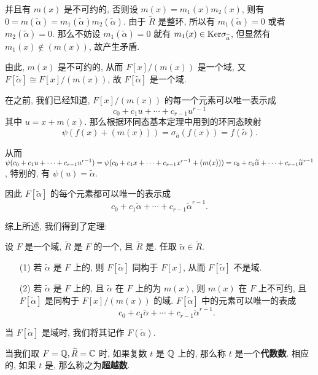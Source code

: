 并且有 $m(x)$ 是不可约的, 否则设 $m(x)=m_1(x)m_2(x)$, 则有 $0=m(\widetilde{\alpha})=m_1(\widetilde{\alpha})m_2(\widetilde{\alpha})$. 由于 $\widetilde{R}$ 是整环, 所以有 $m_1(\widetilde{\alpha})=0$ 或者 $m_2(\widetilde{\alpha})=0$. 那么不妨设 $m_1(\widetilde{\alpha})=0$ 就有 $m_1(x)\in\text {Ker}\sigma_{\widetilde{a}}$, 但显然有 $m_1(x)\notin (m(x))$, 故产生矛盾.

由此, $m(x)$ 是不可约的, 从而 $F[x]/(m(x))$ 是一个域, 又 $F[\widetilde{\alpha}]\cong F[x]/(m(x))$, 故 $F[\widetilde{\alpha}]$ 是一个域.

在之前, 我们已经知道, $F[x]/(m(x))$ 的每一个元素可以唯一表示成 $$c_0+c_1u+\cdots+c_{r-1}u^{r-1}$$ 其中 $u=x+m(x)$. 那么根据环同态基本定理中用到的环同态映射 $$\psi(f(x)+(m(x)))=\sigma_{\widetilde{a}}(f(x))=f(\widetilde{\alpha}).$$

从而 $\psi(c_0+c_1u+\cdots+c_{r-1}u^{r-1})=\psi(c_0+c_1x+\cdots+c_{r-1}x^{r-1}+(m(x)))\\=c_0+c_1\widetilde{\alpha}+\cdots+c_{r-1}\widetilde{\alpha}^{r-1}$, 特别的, 有 $\psi(u)=\widetilde{\alpha}$.

因此 $F[\widetilde{\alpha}]$ 的每个元素都可以唯一的表示成 $$c_0+c_1\widetilde{\alpha}+\cdots+c_{r-1}\widetilde{\alpha}^{r-1}.$$

综上所述, 我们得到了定理:

\begin{theorem}
	设 $F$ 是一个域, $\widetilde{R}$ 是 $F$ 的一个, 且 $\widetilde{R}$ 是. 任取 $\widetilde{\alpha}\in \widetilde{R}$.

	\begin{itemize}[leftmargin=1.5cm]
		\item[(1)] 若 $\widetilde{\alpha}$ 是 $F$ 上的, 则 $F[\widetilde{\alpha}]$ 同构于 $F[x]$, 从而 $F[\widetilde{\alpha}]$ 不是域.
		\item[(2)] 若 $\widetilde{\alpha}$ 是 $F$ 上的, 且 $\widetilde{\alpha}$ 在 $F$ 上的为 $m(x)$, 则 $m(x)$ 在 $F$ 上不可约, 且 $F[\widetilde{\alpha}]$ 是同构于 $F[x]/(m(x))$ 的域. $F[\widetilde{\alpha}]$ 中的元素可以唯一的表成 $$c_0+c_1\widetilde{\alpha}+\cdots+c_{r-1}\widetilde{\alpha}^{r-1}.$$
	\end{itemize}
\end{theorem}

\begin{remark}
	当 $F[\widetilde{\alpha}]$ 是域时, 我们将其记作 $F(\widetilde{\alpha})$.
\end{remark}

\begin{definition}\label{代数数}\label{超越数}
	当我们取 $F=\mathbb Q,\widetilde{R}=\mathbb C$ 时, 如果复数 $t$ 是 $\mathbb Q$ 上的, 那么称 $t$ 是一个\textbf{代数数}. 相应的, 如果 $t$ 是, 那么称之为\textbf{超越数}.
\end{definition}

